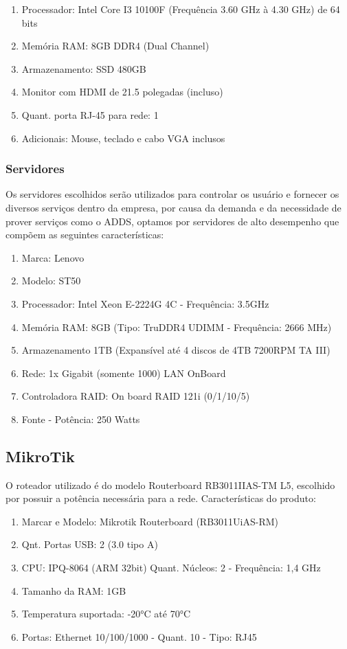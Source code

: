 \documentclass[12pt]{article}
\begin{document}
\begin{enumerate}
    \item Processador: Intel Core I3 10100F (Frequência 3.60 GHz à 4.30 GHz) de 64 bits
    \item Memória RAM: 8GB DDR4 (Dual Channel)
    \item Armazenamento: SSD 480GB
    \item Monitor com HDMI de 21.5 polegadas (incluso)
    \item Quant. porta RJ-45 para rede: 1
    \item Adicionais: Mouse, teclado e cabo VGA inclusos
\end{enumerate}

\subsubsection{Servidores}
Os servidores escolhidos serão utilizados para controlar os usuário e fornecer os diversos serviços dentro da empresa, por causa da demanda e da necessidade de prover serviços como o ADDS, optamos por servidores de alto desempenho que compõem as seguintes características:

\begin{enumerate}
    \item Marca: Lenovo
    \item Modelo: ST50
    \item Processador: Intel Xeon E-2224G 4C - Frequência: 3.5GHz
    \item Memória RAM: 8GB (Tipo: TruDDR4 UDIMM - Frequência: 2666 MHz)
    \item Armazenamento 1TB (Expansível até 4 discos de 4TB 7200RPM TA III)
    \item Rede: 1x Gigabit (somente 1000) LAN OnBoard
    \item Controladora RAID: On board RAID 121i (0/1/10/5)
    \item Fonte - Potência: 250 Watts
\end{enumerate}

\subsection{MikroTik}
O roteador utilizado é do modelo Routerboard RB3011IIAS-TM L5, escolhido por possuir a potência necessária para a rede. Características do produto:

\begin{enumerate}
    \item Marcar e Modelo: Mikrotik Routerboard (RB3011UiAS-RM)
    \item Qnt. Portas USB: 2 (3.0 tipo A)
    \item CPU: IPQ-8064 (ARM 32bit) Quant. Núcleos: 2 - Frequência: 1,4 GHz
    \item Tamanho da RAM: 1GB
    \item Temperatura suportada: -20°C até 70°C
    \item Portas: Ethernet 10/100/1000 - Quant. 10 - Tipo: RJ45
\end{enumerate}
\end{document}
